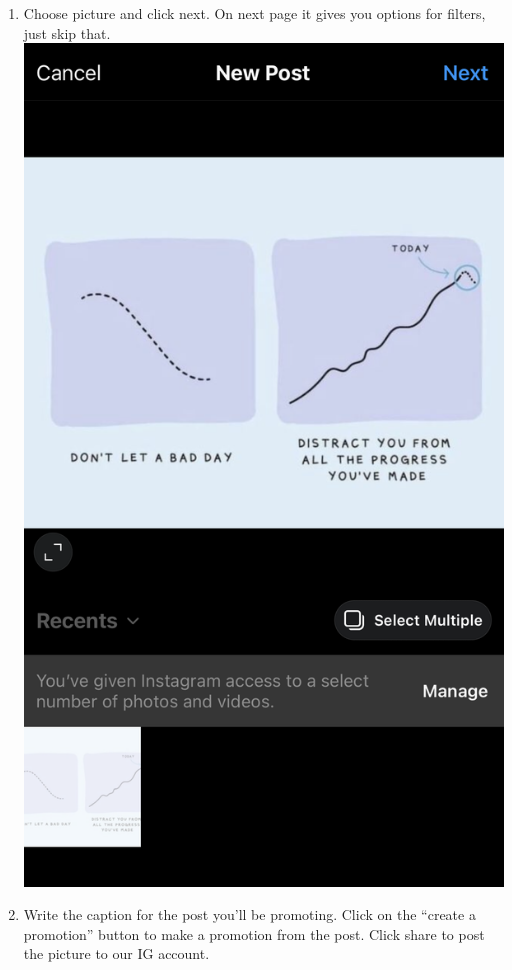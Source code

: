 \documentclass[]{book}
\begin{document}
\begin{enumerate}
\item
  Choose picture and click next. On next page it gives you options for filters, just skip that.
  \includegraphics{images/lab_protocols/ig_ads/7.png}
\item
  Write the caption for the post you'll be promoting. Click on the ``create a promotion'' button to make a promotion from the post. Click share to post the picture to our IG account.


\end{enumerate}
\end{document}
